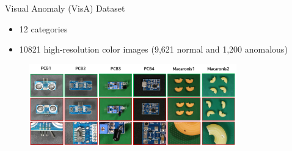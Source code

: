 \documentclass[xcolor=pdftex,dvipsnames,table,mathserif]{beamer}
\begin{document}
\begin{frame}{Visual Anomaly (VisA) Dataset~\tiny{\cite{zou_spot--difference_2022}}}

\begin{itemize}
\item 12 categories
\item 10821 high-resolution color images (9,621 normal and 1,200 anomalous)
\end{itemize}

\begin{figure}[ht]
  \centering
  \includegraphics[width=0.8\textwidth]{visa}
\end{figure}

\end{frame}
\end{document}
